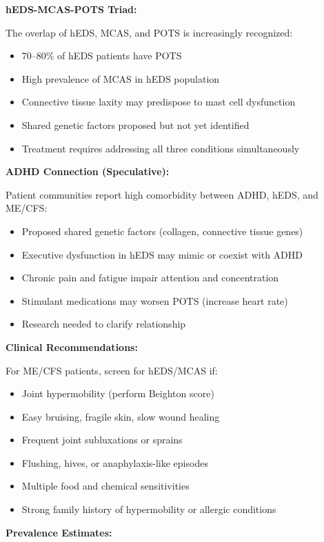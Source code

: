 \begin{observation}
\textbf{hEDS-MCAS-POTS Triad:}

The overlap of hEDS, MCAS, and POTS is increasingly recognized:
\begin{itemize}
    \item 70--80\% of hEDS patients have POTS
    \item High prevalence of MCAS in hEDS population
    \item Connective tissue laxity may predispose to mast cell dysfunction
    \item Shared genetic factors proposed but not yet identified
    \item Treatment requires addressing all three conditions simultaneously
\end{itemize}

\textbf{ADHD Connection (Speculative):}

Patient communities report high comorbidity between ADHD, hEDS, and ME/CFS:
\begin{itemize}
    \item Proposed shared genetic factors (collagen, connective tissue genes)
    \item Executive dysfunction in hEDS may mimic or coexist with ADHD
    \item Chronic pain and fatigue impair attention and concentration
    \item Stimulant medications may worsen POTS (increase heart rate)
    \item Research needed to clarify relationship
\end{itemize}

\textbf{Clinical Recommendations:}

For ME/CFS patients, screen for hEDS/MCAS if:
\begin{itemize}
    \item Joint hypermobility (perform Beighton score)
    \item Easy bruising, fragile skin, slow wound healing
    \item Frequent joint subluxations or sprains
    \item Flushing, hives, or anaphylaxis-like episodes
    \item Multiple food and chemical sensitivities
    \item Strong family history of hypermobility or allergic conditions
\end{itemize}

\textbf{Prevalence Estimates:}


\end{observation}
